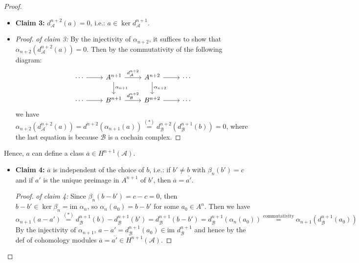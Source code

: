 \begin{proof}
    \begin{itemize}
        \item \textbf{Claim 3:} $d_\mathcal{A}^{n+2} (a)=0$, i.e.: $a\in \ker d_\mathcal{A} ^{n+1}$.
        \item \begin{proof}
            \textit{of claim 3:} By the injectivity of $\alpha_{n+2}$, it suffices to show that $\alpha_{n+2} (d_\mathcal{A}^{n+2} (a))=0$. Then by the commutativity of the following diagram:
            \[
            \begin{tikzcd}
            \cdots \arrow[r] & A^{n+1} \arrow[r, "d^{n+2}_{\mathcal{A}}"] \arrow[d, "\alpha_{n+1}"] & A^{n+2} \arrow[r] \arrow[d, "\alpha_{n+2}"] & \cdots \\
            \cdots \arrow[r] & B^{n+1} \arrow[r, "d^{n+2}_{\mathcal{B}}"]                    & B^{n+2} \arrow[r]                   & \cdots
            \end{tikzcd}
            \]
            we have $\alpha_{n+2} (d_\mathcal{A}^{n+2} (a))= d^{n+2} (\alpha_{n+1} (a)) \overset{(*)}{=} d_\mathcal{B}^{n+2} (d_\mathcal{B}^{n+1} (b))=0$, where the last equation is because $\mathcal{B}$ is a cochain complex.
        \end{proof}
    \end{itemize}
    Hence, $a$ can define a class $\overline{a} \in H^{n+1} (\mathcal{A})$.

    \begin{itemize}
        \item \textbf{Claim 4:} $\overline{a}$ is independent of the choice of $b$, i.e.: if $b'\neq b$ with $\beta_n(b')=c$ and if $a'$ is the unique preimage in $A^{n+1}$ of $b'$, then $\overline{a} = \overline{a'}$.
        \begin{proof}
            \textit{of claim 4:} Since $\beta_n (b-b') =c-c=0$, then $b-b' \in \ker \beta_n =\text{im } \alpha_{n}$, so $\alpha_n (a_0)= b-b'$ for some $a_0 \in A^n$. Then we have
            \[
            \alpha_{n+1} (a-a') \overset{(*)}{=} d^{n+1}_\mathcal{B} (b)- d^{n+1}_\mathcal{B} (b') =d^{n+1}_\mathcal{B} (b-b') =d^{n+1}_\mathcal{B} (\alpha_n(a_0)) \overset{\text{commutativity}}{=} \alpha_{n+1} (d^{n+1}_\mathcal{B} (a_0))
            \]
            By the injectivity of $\alpha_{n+1}$, $a-a'= d^{n+1}_\mathcal{B} (a_0) \in \text{im }d^{n+1}_\mathcal{B}$ and hence by the def of cohomology modules $\overline{a} = \overline{a'} \in H^{n+1} (\mathcal{A})$.
        \end{proof}


\end{itemize}
\end{proof}
